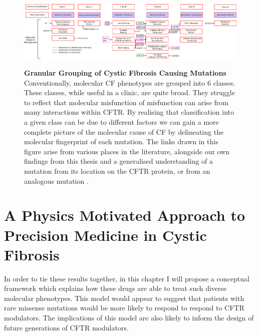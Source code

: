 \begin{landscape}
\begin{figure}
	\begin{center}
	\includegraphics[width=1.5\textwidth]{figures/perspective/classes_mutations.pdf}\\
	\end{center}
	\captionsetup{singlelinecheck = false, justification=raggedright}
	\caption[Granular grouping of CF pathogenesis]{\textbf{Granular Grouping of Cystic Fibrosis Causing Mutations}{ Conventionally, molecular CF phenotypes are grouped into 6 classes. These classes, while useful in a clinic, are quite broad. They struggle to reflect that molecular misfunction of misfunction can arise from many interactions within CFTR. By realising that classification into a given class can be due to different factors we can gain a more complete picture of the molecular cause of CF by delineating the molecular fingerprint of each mutation. The links drawn in this figure arise from various places in the literature, alongside our own findings from this thesis and a generalised understanding of a mutation from its location on the CFTR protein, or from an analogous mutation \cite{bompadre2007, gong2004, wong2022, vangoor2009, vangoor2014, hoffmann2018, thelin2007, gene2008, trikafta_website, phuan2018, ensinck2022 }.}
	}

	\label{granular_classification}
\end{figure}
\end{landscape}


\section{A Physics Motivated Approach to Precision Medicine in Cystic Fibrosis}

In order to tie these results together, in this chapter I will propose a conceptual framework which explains how these drugs are able to treat such diverse molecular phenotypes. This model would appear to suggest that patients with rare missense mutations would be more likely to respond to respond to CFTR modulators. The implications of this model are also likely to inform the design of future generations of CFTR modulators. 

